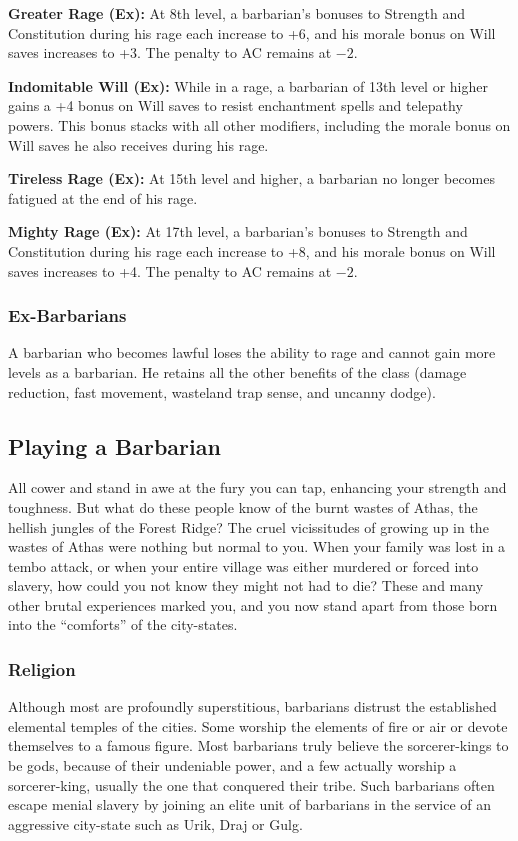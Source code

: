 \textbf{Greater Rage (Ex):} At 8th level, a barbarian's bonuses to Strength and Constitution during his rage each increase to +6, and his morale bonus on Will saves increases to +3. The penalty to AC remains at $-2$.

\textbf{Indomitable Will (Ex):} While in a rage, a barbarian of 13th level or higher gains a +4 bonus on Will saves to resist enchantment spells and telepathy powers. This bonus stacks with all other modifiers, including the morale bonus on Will saves he also receives during his rage.

\textbf{Tireless Rage (Ex):} At 15th level and higher, a barbarian no longer becomes fatigued at the end of his rage.

\textbf{Mighty Rage (Ex):} At 17th level, a barbarian's bonuses to Strength and Constitution during his rage each increase to +8, and his morale bonus on Will saves increases to +4. The penalty to AC remains at $-2$.

\subsubsection{Ex-Barbarians}

A barbarian who becomes lawful loses the ability to rage and cannot gain more levels as a barbarian. He retains all the other benefits of the class (damage reduction, fast movement, wasteland trap sense, and uncanny dodge).

\subsection{Playing a Barbarian}

All cower and stand in awe at the fury you can tap, enhancing your strength and toughness. But what do these people know of the burnt wastes of Athas, the hellish jungles of the Forest Ridge? The cruel vicissitudes of growing up in the wastes of Athas were nothing but normal to you. When your family was lost in a tembo attack, or when your entire village was either murdered or forced into slavery, how could you not know they might not had to die? These and many other brutal experiences marked you, and you now stand apart from those born into the ``comforts'' of the city-states.

\subsubsection{Religion}

Although most are profoundly superstitious, barbarians distrust the established elemental temples of the cities. Some worship the elements of fire or air or devote themselves to a famous figure. Most barbarians truly believe the sorcerer-kings to be gods, because of their undeniable power, and a few actually worship a sorcerer-king, usually the one that conquered their tribe. Such barbarians often escape menial slavery by joining an elite unit of barbarians in the service of an aggressive city-state such as Urik, Draj or Gulg.

